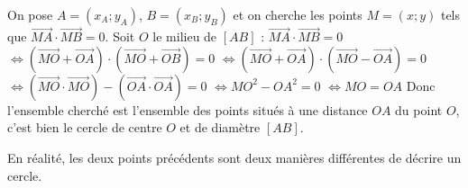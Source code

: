 	\begin{demonstration}
		On pose $A = (x_A; y_A)$, $B = (x_B; y_B)$ et on cherche les points $M = (x; y)$ tels que $\overrightarrow{MA} \cdot \overrightarrow{MB} = 0$.
		\newpar
		Soit $O$ le milieu de $[AB]$ :
		\newpar
		$\overrightarrow{MA} \cdot \overrightarrow{MB} = 0$
		\newline
		$\iff (\overrightarrow{MO} + \overrightarrow{OA}) \cdot (\overrightarrow{MO} + \overrightarrow{OB}) = 0$
		\newline
		$\iff (\overrightarrow{MO} + \overrightarrow{OA}) \cdot (\overrightarrow{MO} - \overrightarrow{OA}) = 0$
		\newline
		$\iff (\overrightarrow{MO} \cdot \overrightarrow{MO}) - (\overrightarrow{OA} \cdot \overrightarrow{OA}) = 0$
		\newline
		$\iff MO^2 - OA^2 = 0$
		\newline
		$\iff MO = OA$
		\newpar
		Donc l'ensemble cherché est l'ensemble des points situés à une distance $OA$ du point $O$, c'est bien le cercle de centre $O$ et de diamètre $[AB]$.
	\end{demonstration}

	En réalité, les deux points précédents sont deux manières différentes de décrire un cercle.

